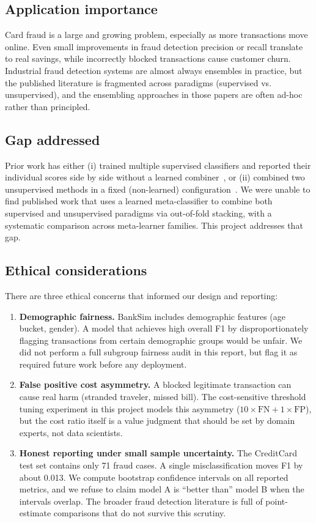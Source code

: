 \documentclass[11pt]{article}
\begin{document}
\subsection{Application importance}
Card fraud is a large and growing problem, especially as more transactions move online. Even small improvements in fraud detection precision or recall translate to real savings, while incorrectly blocked transactions cause customer churn. Industrial fraud detection systems are almost always ensembles in practice, but the published literature is fragmented across paradigms (supervised vs. unsupervised), and the ensembling approaches in those papers are often ad-hoc rather than principled.

\subsection{Gap addressed}
Prior work has either (i) trained multiple supervised classifiers and reported their individual scores side by side without a learned combiner~\cite{alarfaj2022}, or (ii) combined two unsupervised methods in a fixed (non-learned) configuration~\cite{pumsirirat2018}. We were unable to find published work that uses a learned meta-classifier to combine both supervised and unsupervised paradigms via out-of-fold stacking, with a systematic comparison across meta-learner families. This project addresses that gap.

\subsection{Ethical considerations}
There are three ethical concerns that informed our design and reporting:

\begin{enumerate}
    \item \textbf{Demographic fairness.} BankSim includes demographic features (age bucket, gender). A model that achieves high overall F1 by disproportionately flagging transactions from certain demographic groups would be unfair. We did not perform a full subgroup fairness audit in this report, but flag it as required future work before any deployment.
    \item \textbf{False positive cost asymmetry.} A blocked legitimate transaction can cause real harm (stranded traveler, missed bill). The cost-sensitive threshold tuning experiment in this project models this asymmetry ($10 \times \text{FN} + 1 \times \text{FP}$), but the cost ratio itself is a value judgment that should be set by domain experts, not data scientists.
    \item \textbf{Honest reporting under small sample uncertainty.} The CreditCard test set contains only 71 fraud cases. A single misclassification moves F1 by about 0.013. We compute bootstrap confidence intervals on all reported metrics, and we refuse to claim model A is ``better than'' model B when the intervals overlap. The broader fraud detection literature is full of point-estimate comparisons that do not survive this scrutiny.
\end{enumerate}
\end{document}
